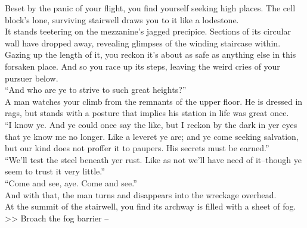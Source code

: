 Beset by the panic of your flight, you find yourself seeking high places. The cell block’s lone, surviving stairwell draws you to it like a lodestone.\\

It stands teetering on the mezzanine’s jagged precipice. Sections of its circular wall have dropped away, revealing glimpses of the winding staircase within. Gazing up the length of it, you reckon it’s about as safe as anything else in this forsaken place. And so you race up its steps, leaving the weird cries of your pursuer below.\\

“And who are ye to strive to such great heights?”\\

A man watches your climb from the remnants of the upper floor. He is dressed in rags, but stands with a posture that implies his station in life was great once.\\

“I know ye. And ye could once say the like, but I reckon by the dark in yer eyes that ye know me no longer. Like a leveret ye are; and ye come seeking salvation, but our kind does not proffer it to paupers. His secrets must be earned.”\\

“We’ll test the steel beneath yer rust. Like as not we’ll have need of it--though ye seem to trust it very little.”\\

“Come and see, aye. Come and see.”\\

And with that, the man turns and disappears into the wreckage overhead.\\

At the summit of the stairwell, you find its archway is filled with a sheet of fog.\\

>> Broach the fog barrier -- 